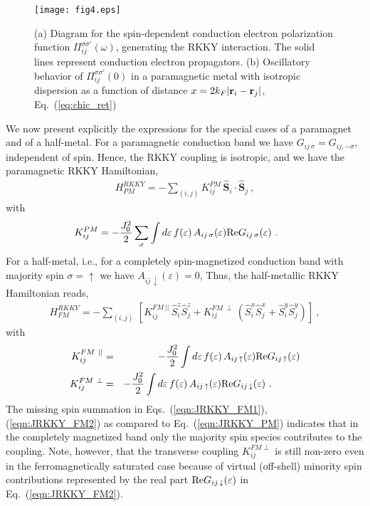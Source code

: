 \documentclass[12pt,twoside]{article}
\newcommand{\ve}[1]{\mathbf{#1}}
\newcommand{\Eq}[1]{Eq.~(\ref{#1})}
\begin{document}
\begin{figure}[t]
\centering
\texttt{[image: fig4.eps]}
\caption{
(a) Diagram for the spin-dependent conduction electron polarization function 
$\Pi_{ij}^{\sigma\sigma'}(\omega)$, generating the RKKY interaction.
The solid lines represent conduction electron propagators.
(b) Oscillatory behavior of $\Pi_{ij}^{\sigma\sigma'}(0)$ in a 
paramagnetic metal with isotropic dispersion as a function of 
distance $x=2k_F|{\bf r}_i-{\bf r}_j|$, \Eq{eq:chic_ret} 
\label{fig:diagram_RKKY}
}
\end{figure}

We now present explicitly the expressions for the special cases of a 
paramagnet and of a half-metal. For a paramagnetic conduction band we have
$G_{ij\,\sigma}=G_{ij, -\sigma}$, independent of spin. Hence, the RKKY coupling is
isotropic, and we have the paramagnetic RKKY Hamiltonian, 
\begin{eqnarray}\label{eqn:HRKKY_PM}
H^{RKKY}_{PM} = - \sum_{(i,j)} K_{ij}^{PM}\, \hat{\ve{S}}_i\cdot\hat{\ve{S}}_j  \ ,
\end{eqnarray}
with 
\begin{eqnarray}
K_{ij}^{PM} = -\frac{J_{0}^2}{2}\sum_{\sigma} 
\int d\varepsilon\, f(\varepsilon)\, 
A_{ij\,\sigma}(\varepsilon) {\rm Re} G_{ij\,\sigma}(\varepsilon) \ .
\phantom{xxx}
\label{eqn:JRKKY_PM}
\end{eqnarray}
For a half-metal, i.e., for a completely spin-magnetized conduction band
with majority spin $\sigma=\uparrow$ we have $A_{ij\,\downarrow}(\varepsilon)=0$, 
Thus, the half-metallic RKKY Hamiltonian reads,
\begin{eqnarray}\label{eqn:HRKKY_FM}
H^{RKKY}_{FM} = - \sum_{(i,j)} \, \left[
K_{ij}^{FM\ ||}\, \hat{S}_i^z\hat{S}_j^z  
 + K_{ij}^{FM\ \perp}\, \left(\hat{S}_i^x\hat{S}_j^x+\hat{S}_i^y\hat{S}_j^y
\right)\right] \ , 
\end{eqnarray}
with 
\begin{eqnarray}
K_{ij}^{FM\ ||} &=& - \frac{J_{0}^2}{2} 
\int d\varepsilon\, f(\varepsilon)\, 
A_{ij\,\uparrow}(\varepsilon) {\rm Re} G_{ij\,\uparrow}(\varepsilon) 
\label{eqn:JRKKY_FM1} \\ 
K_{ij}^{FM\ \perp} &=& - \frac{J_{0}^2}{2} 
\int d\varepsilon\, f(\varepsilon)\, 
A_{ij\,\uparrow}(\varepsilon) {\rm Re} G_{ij\,\downarrow}(\varepsilon) \ . 
\phantom{xxxxx}
\label{eqn:JRKKY_FM2} 
\end{eqnarray}
The missing spin summation in Eqs.~(\ref{eqn:JRKKY_FM1}), (\ref{eqn:JRKKY_FM2}) 
as compared to Eq.~(\ref{eqn:JRKKY_PM}) indicates that 
in the completely magnetized band only the majority spin species contributes
to the coupling.
Note, however, that the transverse coupling $K^{FM\perp}_{ij}$ is still 
non-zero even in the ferromagnetically saturated case because of virtual
(off-shell) minority spin contributions represented by the real part 
${\rm Re} G_{ij\,\downarrow}(\varepsilon)$ in Eq.~(\ref{eqn:JRKKY_FM2}).
\end{document}
